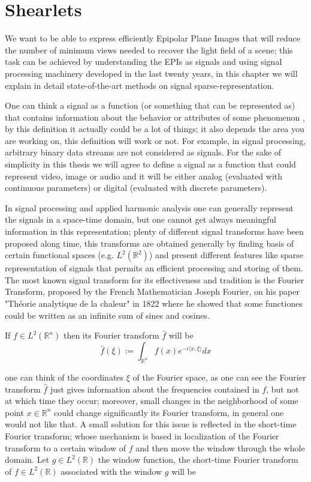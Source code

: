 \chapter{Shearlets}

We want to be able to express efficiently Epipolar Plane Images that will reduce the number of minimum views needed to recover the light field of a scene; this task can be achieved by understanding the EPIs as signals and using signal processing machinery developed in the last twenty years, in this chapter we will explain in detail state-of-the-art methods on signal sparse-representation.

\bigskip

One can think a signal as a function (or something that can be represented as) that contains information about the behavior or attributes of some phenomenon \cite{Roland}, by this definition it actually could be a lot of things; it also depends the area you are working on, this definition will work or not. For example, in signal processing, arbitrary binary data streams are not considered as signals. For the sake of simplicity in this thesis we will agree to define a signal as a function that could represent video, image or audio and it will be either analog (evaluated with continuous parameters) or digital (evaluated with discrete parameters). 

\bigskip

In signal processing and applied harmonic analysis one can generally represent the signals in a space-time domain, but one cannot get always meaningful information in this representation; plenty of different signal transforms have been proposed along time, this transforms are obtained generally by finding basis of certain functional spaces (e.g. $L^2(\mathbb{R}^2)$) and present different features like sparse representation of signals that permits an efficient processing and storing of them. The most known signal transform for its effectiveness and tradition is the Fourier Transform, proposed by the French Mathematician Joseph Fourier, on his paper "Théorie analytique de la chaleur" in 1822 where he showed that some functiones could be written as an infinite sum of sines and cosines. 

\bigskip

If $f\in L^2(\mathbb{R}^n)$ then its Fourier transform $\hat{f}$ will be 
$$
\hat{f}(\xi) := \int_{\mathbb{R}^n}f(x)e^{-i\langle x,\xi\rangle}dx
$$

one can think of the coordinates $\xi$ of the Fourier space, as one can see the Fourier transform $\hat{f}$ just gives information about the frequencies contained in $f$, but not at which time they occur; moreover, small changes in the neighborhood of some point $x\in\mathbb{R}^n$ could change significantly its Fourier transform, in general one would not like that. A small solution for this issue is reflected in the short-time Fourier transform; whose mechanism is based in localization of the Fourier transform to a certain window of $f$ and then move the window through the whole domain. Let $g\in L^2(\mathbb{R})$ the window function, the short-time Fourier transform of $f\in L^2(\mathbb{R})$ associated with the window $g$ will be

